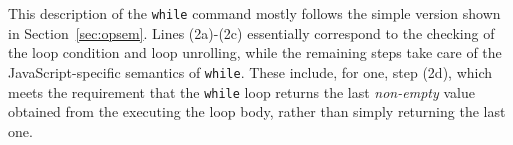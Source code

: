 \documentclass[a4paper,11pt,twoside]{report}
\begin{document}
\noindent This description of the \texttt{while} command mostly follows the simple version shown in Section~\ref{sec:opsem}. Lines (2a)-(2c) essentially correspond to the checking of the loop condition and loop unrolling, while the remaining steps take care of the JavaScript-specific semantics of \texttt{while}. These include, for one, step (2d), which meets the requirement that the \texttt{while} loop returns the last {\em non-empty} value obtained from the executing the loop body, rather than simply returning the last one.


\end{document}
